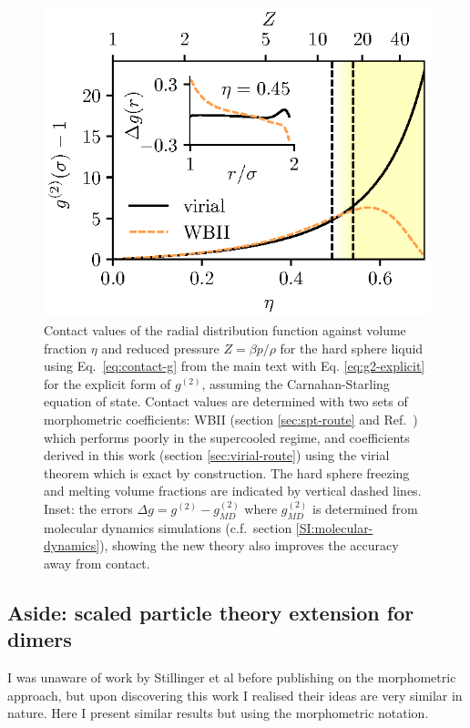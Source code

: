 \documentclass[11pt]{report}
\begin{document}
\begin{figure}
 \includegraphics[width=\linewidth]{g2_contact}
 \caption{
   Contact values of the radial distribution function against volume fraction $\eta$ and reduced pressure $Z = \beta p / \rho$ for the hard sphere liquid using Eq.\ \eqref{eq:contact-g} from the main text with Eq. \eqref{eq:g2-explicit} for the explicit form of $g^{(2)}$, assuming the Carnahan-Starling equation of state.
   Contact values are determined with two sets of morphometric coefficients: WBII (section \ref{sec:spt-route} and Ref.\ \cite{Hansen-Goos2006}) which performs poorly in the supercooled regime, and coefficients derived in this work (section \ref{sec:virial-route}) using the virial theorem which is exact by construction.
   The hard sphere freezing and melting volume fractions are indicated by vertical dashed lines.
   Inset: the errors $\Delta g = g^{(2)} - g^{(2)}_{MD}$ where $g^{(2)}_{MD}$ is determined from molecular dynamics simulations (c.f.\ section \ref{SI:molecular-dynamics}), showing the new theory also improves the accuracy away from contact.
 }
\label{fig:contact-g}
\end{figure}

\subsection{Aside: scaled particle theory extension for dimers}

I was unaware of work by Stillinger et al \cite{Stillinger2006} before publishing on the morphometric approach, but upon discovering this work I realised their ideas are very similar in nature.
Here I present similar results but using the morphometric notation.%
\end{document}
